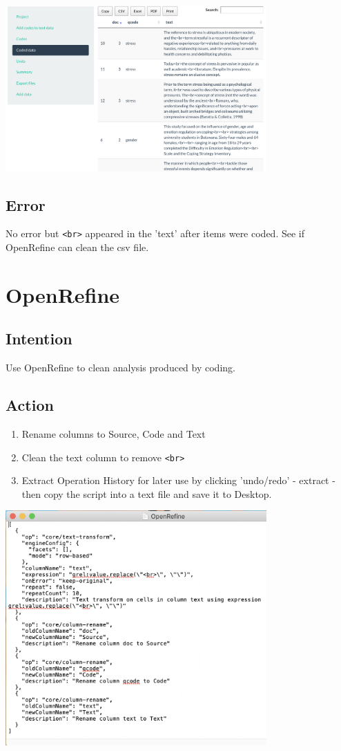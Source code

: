 \documentclass{article}
\begin{document}
\includegraphics[width=10cm]{QCoder_coded.png}

\subsection{Error}
No error but \verb|<br>| appeared in the 'text' after items were coded. See if OpenRefine can clean the csv file.

\section{OpenRefine}

\subsection{Intention}
Use OpenRefine to clean analysis produced by coding.

\subsection{Action}
\begin{enumerate}
    \item Rename columns to Source, Code and Text 
    \item Clean the text column to remove \verb|<br>| 
    \item Extract Operation History for later use by clicking 'undo/redo' - extract - then copy the script into a text file and save it to Desktop.
\end{enumerate}

\includegraphics[width=10cm]{openrefine.png}
\end{document}
